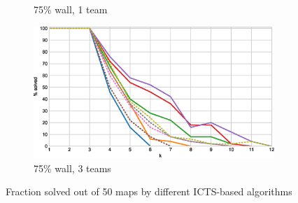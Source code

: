 \documentclass[english]{article}
\newcommand\graphwidth{0.49\textwidth}
\begin{document}
\begin{figure}[t]
\begin{subfigure}{\graphwidth}
			\caption{75\% wall, 1 team}
			\label{fig:i-75-1-p}
		\end{subfigure}
		\begin{subfigure}{\graphwidth}
			\centering
			\includegraphics[width=\linewidth]{img/results/icts-comparison/75-3-p}
			\caption{75\% wall, 3 teams}
			\label{fig:i-75-3-p}
		\end{subfigure}
		\caption{Fraction solved out of 50 maps by different ICTS-based algorithms}
		\label{fig:i-probs}
	\end{figure}
\end{document}

